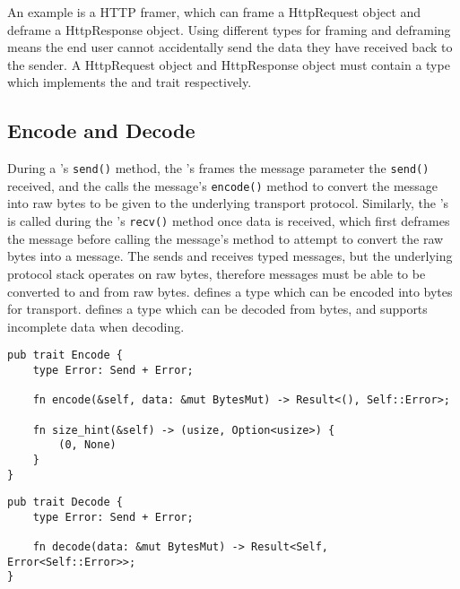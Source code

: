 An example is a HTTP framer, which can frame a HttpRequest object and deframe a HttpResponse object.
Using different types for framing and deframing means the end user cannot accidentally send the data they have received
back to the sender.
A HttpRequest object and HttpResponse object must contain a type which implements the \encode{} and \decode{}
trait respectively.

\subsection{Encode and Decode}\label{subsec:encode-and-decode}
During a \connection{}'s \texttt{send()} method, the \connection{}'s \framer{} frames the message parameter the
\texttt{send()} received, and the \framer{} calls the message's \texttt{encode()} method to convert the message into raw
bytes to be given
to the underlying transport protocol.
Similarly, the \connection{}'s \framer{} is called during the \connection{}'s \texttt{recv()} method once data is
received, which first deframes the message before calling the message's \decode{} method to attempt to convert the
raw bytes into a message.
The \connection{} sends and receives typed messages, but the underlying protocol stack operates on raw bytes,
therefore messages must be able to be converted to and from raw bytes.
\encode{} defines a type which can be encoded into bytes for transport.
\decode{} defines a type which can be decoded from bytes, and supports incomplete data when decoding.

\begin{lstlisting}[float=h, label=lst:encode, caption={The Encode trait, showing the size\_hint method.}]
pub trait Encode {
    type Error: Send + Error;

    fn encode(&self, data: &mut BytesMut) -> Result<(), Self::Error>;

    fn size_hint(&self) -> (usize, Option<usize>) {
        (0, None)
    }
}
\end{lstlisting}

\begin{lstlisting}[float=h, label=lst:decode, caption={The Decode trait.}]
pub trait Decode {
    type Error: Send + Error;

    fn decode(data: &mut BytesMut) -> Result<Self, Error<Self::Error>>;
}
\end{lstlisting}

